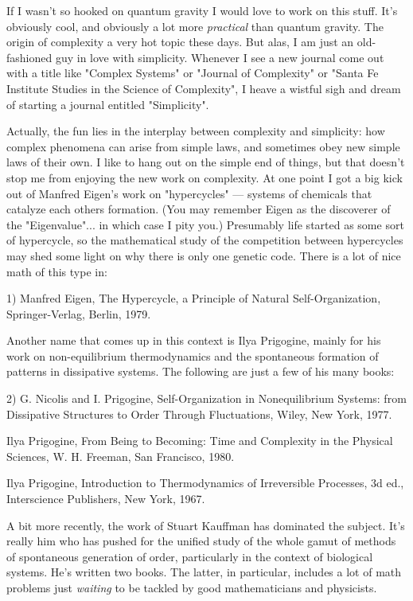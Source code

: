 If I wasn't so hooked on quantum gravity I would love to work on this
stuff.  It's obviously cool, and obviously a lot more \emph{practical} than
quantum gravity.  The origin of complexity a very hot topic these days.
But alas, I am just an old-fashioned guy in love with simplicity.
Whenever I see a new journal come out with a title like "Complex
Systems" or "Journal of Complexity" or "Santa Fe Institute Studies in
the Science of Complexity", I heave a wistful sigh and dream of starting
a journal entitled "Simplicity".

Actually, the fun lies in the interplay between complexity and
simplicity: how complex phenomena can arise from simple laws, and
sometimes obey new simple laws of their own.  I like to hang out on the
simple end of things, but that doesn't stop me from enjoying the new
work on complexity.  At one point I got a big kick out of Manfred
Eigen's work on "hypercycles" --- systems of chemicals that catalyze
each others formation.  (You may remember Eigen as the discoverer of the
"Eigenvalue"... in which case I pity you.)  Presumably life started as
some sort of hypercycle, so the mathematical study of the competition
between hypercycles may shed some light on why there is only one genetic
code.  There is a lot of nice math of this type in:


1) Manfred Eigen, The Hypercycle, a Principle of Natural
Self-Organization, Springer-Verlag, Berlin, 1979.


Another name that comes up in this context is Ilya Prigogine, mainly for
his work on non-equilibrium thermodynamics and the spontaneous formation
of patterns in dissipative systems.  The following are just a few of his
many books:


2) G. Nicolis and I. Prigogine, Self-Organization in Nonequilibrium 
Systems: from Dissipative Structures to Order Through Fluctuations,
Wiley, New York, 1977.

Ilya Prigogine, From Being to Becoming: Time and Complexity in the 
Physical Sciences, W. H. Freeman, San Francisco, 1980.

Ilya Prigogine, Introduction to Thermodynamics of Irreversible
Processes,  3d ed., Interscience Publishers, New York, 1967.


A bit more recently, the work of Stuart Kauffman has dominated the
subject.  It's really him who has pushed for the unified study of the
whole gamut of methods of spontaneous generation of order, particularly
in the context of biological systems.  He's written two books.  The
latter, in particular, includes a lot of math problems just \emph{waiting}
to be tackled by good mathematicians and physicists.


